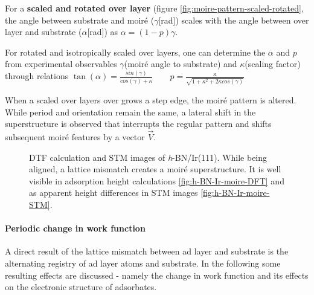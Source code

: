 For a \textbf{scaled and rotated over layer} (figure \ref{fig:moire-pattern-scaled-rotated}, the angle between substrate and moir\'e ($\gamma$[rad]) scales with the angle between over layer and substrate ($\alpha$[rad]) as $\alpha=(1-p)\gamma$.

For rotated and isotropically scaled over layers, one can determine the $\alpha$ and $p$ from experimental observables $\gamma$(moir\'e angle to substrate) and $\kappa$(scaling factor) through relations $ \tan(\alpha)=\frac{sin(\gamma)}{cos(\gamma)+\kappa}\qquad p=\frac{\kappa}{\sqrt{1+\kappa^2+2\kappa cos(\gamma)}}$

When a scaled over layers over grows a step edge, the moir\'e pattern is altered. While period and orientation remain the same, a lateral shift in the superstructure is observed that interrupts the regular pattern and shifts subsequent moir\'e features by a vector $\vec{V}$.

\begin{figure} \centering
	 \qquad
	\caption{DTF calculation and STM images of \textit{h}-BN/Ir(111). While being aligned, a lattice mismatch creates a moir\'e  superstructure. It is well visible in adsorption height calculations \ref{fig:h-BN-Ir-moire-DFT} and as apparent height differences in STM images \ref{fig:h-BN-Ir-moire-STM}.}
	\label{fig:moire-DFT-TSM}
\end{figure}


\paragraph{Periodic change in work function}
A direct result of the lattice mismatch between ad layer and substrate is the alternating registry of ad layer atoms and substrate. In the following some resulting effects are discussed - namely the change in work function and its effects on the electronic structure of adsorbates.
